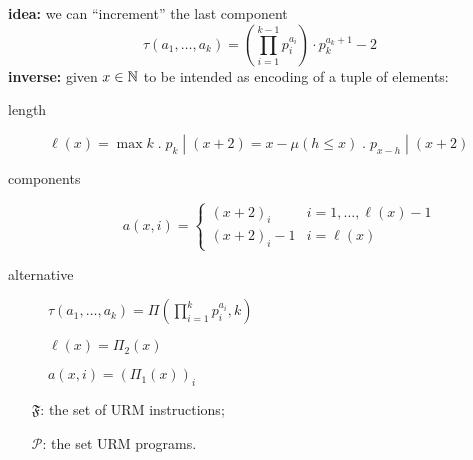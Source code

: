 \textbf{idea:} we can ``increment'' the last component
$$\tau(a_1, \dots, a_k) = (\prod_{i=1}^{k-1}p_i^{a_i}) \cdot p_k^{a_k+1} - 2$$
\textbf{inverse:} given $x \in \mathbb{N}$ to be intended as encoding of a
tuple of elements:

\begin{description}
\item[length]
  $\ell(x) = \max k \; . \; p_k \; | \; (x+2) = x - \mu (h \leq x) \;
  . \; p_{x-h} \; | \;(x+2)$
\item[components] \[a(x,i) = \begin{cases}
      (x+2)_i & i = 1, \dots, \ell(x)-1 \\
      (x+2)_i - 1 & i = \ell(x) 
    \end{cases}\]
\item[alternative]{
    $\tau(a_1, \dots, a_k) = \Pi(\prod_{i=1}^k p_i^{a_i}, k)$

    $\ell(x) = \Pi_2(x)$

    $a(x,i) = (\Pi_1(x))_i$
  }
\end{description}

\begin{notation}
  \begin{itemize}
  \item[$\mathfrak{F}$:] the set of URM instructions;
    \item[$\mathcal{P}$:] the set URM programs.
  \end{itemize}
\end{notation}  


